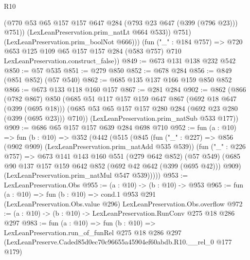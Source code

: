 \begin{lexlean}{R10}
\begin{coremodule}
                (@770 @53 @65 @157 @157 @647 @284 (@793 @23 @647 (@399 (@796 @23))) @751))
              (LexLeanPreservation.prim_natLt @664 @533))
            @751)
          (LexLeanPreservation.prim_boolNot @666)))
      (fun ("_" : @184 @757) =>
      @720 @653 @125 @109 @65 @157 @157 @284 (@583 @757) @710 LexLeanPreservation.construct_false))
@849 := @673 @131 @138 @232 @542
@850 := @57 @535
@851 := @279 @850
@852 := @678 @284
@856 := @849 (@851 @852) (@57 @540)
@862 := @685 @135 @137 @166 @159 @850 @852
@866 := @673 @133 @118 @160 @157
@867 := @281 @284
@902 := @862
    (@866
      (@782 @867)
      @850
      (@685
        @51
        @117
        @157
        @159
        @647
        @867
        (@692 @18 @647 (@399 (@695 @18)))
        (@685 @53 @65 @157 @157 @280 @284 (@692 @23 @280 (@399 (@695 @23))) @710))
      (LexLeanPreservation.prim_natSub @533 @177))
@909 := @686 @65 @157 @157 @639 @284 @698 @710
@952 := fun (a : @10) =>
  fun (b : @10) =>
  @352
    (@442
      (@515
        (@845
          (fun ("_" : @227) => @856 (@902 @909) (LexLeanPreservation.prim_natAdd @535 @539))
          (fun ("_" : @226 @757) =>
          @673
            @141
            @143
            @160
            @551
            (@279 @642 @852)
            (@57 @549)
            (@685 @90 @137 @157 @159 @642 @852 (@692 @42 @642 (@399 (@695 @42))) @909)
            (LexLeanPreservation.prim_natMul @547 @539)))))
@953 := LexLeanPreservation.Obs
@955 := (a : @10) -> (b : @10) -> @953
@965 := fun (a : @10) =>
  fun (b : @10) =>
  cond.{1} @953 @291 (LexLeanPreservation.Obs.value @296) LexLeanPreservation.Obs.overflow
@972 := (a : @10) -> (b : @10) -> LexLeanPreservation.RunConv @275 @18 @286 @297
@983 := fun (a : @10) =>
  fun (b : @10) =>
  LexLeanPreservation.run_of_funRel
    @275
    @18
    @286
    @297
    (LexLeanPreserve.Caded85d0ec70c96655a45904ef60abdb.R10.__rel_0 @177 @179)
\end{coremodule}
\end{lexlean}
